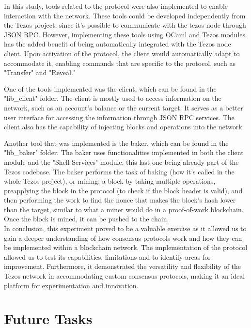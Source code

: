 In this study, tools related to the protocol were also implemented to enable interaction with the network. These tools could be developed independently from the Tezos project, since it's possible to communicate with the tezos node through JSON RPC. However, implementing these tools using OCaml and Tezos modules has the added benefit of being automatically integrated with the Tezos node client. Upon activation of the protocol, the client would automatically adapt to accommodate it, enabling commands that are specific to the protocol, such as "Transfer" and "Reveal."

One of the tools implemented was the client, which can be found in the "lib\_client" folder. The client is mostly used to access information on the network, such as an account's balance or the current target. It serves as a better user interface for accessing the information through JSON RPC services. The client also has the capability of injecting blocks and operations into the network.

Another tool that was implemented is the baker, which can be found in the "lib\_baker" folder. The baker uses functionalities implemented in both the client module and the "Shell Services" module, this last one being already part of the Tezos codebase.
The baker performs the task of baking (how it's called in the whole Tezos project), or mining, a block by taking multiple operations, preapplying the block in the protocol (to check if the block header is valid), and then performing the work to find the nonce that makes the block's hash lower than the target, similar to what a miner would do in a proof-of-work blockchain. Once the block is mined, it can be pushed to the chain.\\


In conclusion, this experiment proved to be a valuable exercise as it allowed us to gain a deeper understanding of how consensus protocols work and how they can be implemented within a blockchain network. The implementation of the protocol allowed us to test its capabilities, limitations and to identify areas for improvement. Furthermore, it demonstrated the versatility and flexibility of the Tezos network in accommodating custom consensus protocols, making it an ideal platform for experimentation and innovation.

\section{Future Tasks}

